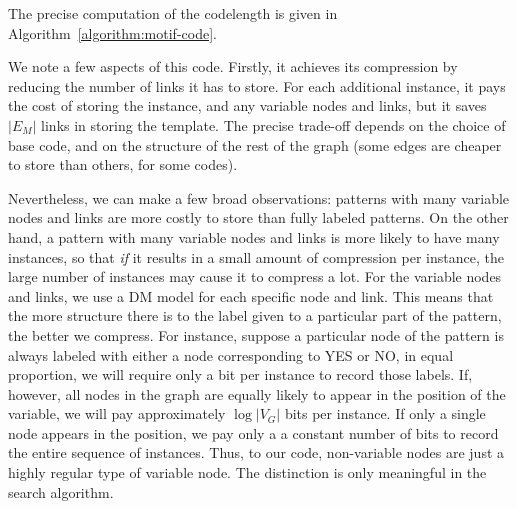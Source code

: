 \documentclass[11pt]{article}
\begin{document}
The precise computation of the codelength is given in Algorithm~\ref{algorithm:motif-code}. 

We note a few aspects of this code. Firstly, it achieves its compression by reducing the number of links it has to store. For each additional instance, it pays the cost of storing the instance, and any variable nodes and links, but it saves $|E_M|$ links in storing the template. The precise trade-off depends on the choice of base code, and on the structure of the rest of the graph (some edges are cheaper to store than others, for some codes).

Nevertheless, we can make a few broad observations: patterns with many variable nodes and links are more costly to store than fully labeled patterns. On the other hand, a pattern with many variable nodes and links is more likely to have many instances, so that \emph{if} it results in a small amount of compression per instance, the large number of instances may cause it to compress a lot. For the variable nodes and links, we use a DM model for each specific node and link. This means that the more structure there is to the label given to a particular part of the pattern, the better we compress. For instance, suppose a particular node of the pattern is always labeled with either a node corresponding to YES or NO, in equal proportion, we will require only a bit per instance to record those labels. If, however, all nodes in the graph are equally likely to appear in the position of the variable, we will pay approximately $\log |V_G|$ bits per instance. If only a single node appears in the position, we pay only a a constant number of bits to record the entire sequence of instances. Thus, to our code, non-variable nodes are just a highly regular type of variable node. The distinction is only meaningful in the search algorithm.
\end{document}
